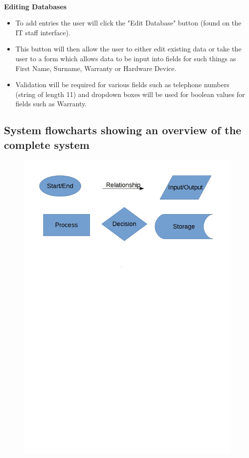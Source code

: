 \

\textbf{Editing Databases}
\begin{itemize}
\item To add entries the user will click the "Edit Database" button (found on the IT staff interface).
\item This button will then allow the user to either edit existing data or take the user to a form which allows data to be input into fields for such things as First Name, Surname, Warranty or Hardware Device.
\item Validation will be required for various fields such as telephone numbers (string of length 11) and dropdown boxes will be used for boolean values for fields such as Warranty.
\end{itemize}


\subsection{System flowcharts showing an overview of the complete system}

\begin{figure}[H]
\includegraphics[width=.9\textwidth,height=.9\textheight,keepaspectratio]{FlowchartKey.jpg}
\end{figure}

